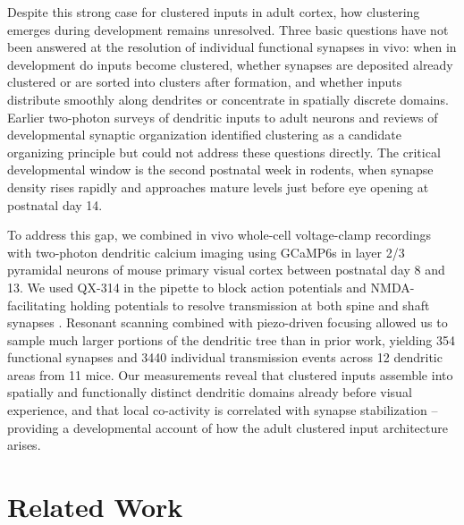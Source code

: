 Despite this strong case for clustered inputs in adult cortex, how clustering emerges during development remains unresolved. Three basic questions have not been answered at the resolution of individual functional synapses in vivo: when in development do inputs become clustered, whether synapses are deposited already clustered or are sorted into clusters after formation, and whether inputs distribute smoothly along dendrites or concentrate in spatially discrete domains. Earlier two-photon surveys of dendritic inputs to adult neurons \citep{jia2010dendritic} and reviews of developmental synaptic organization \citep{winnubst2012synaptic} identified clustering as a candidate organizing principle but could not address these questions directly. The critical developmental window is the second postnatal week in rodents, when synapse density rises rapidly and approaches mature levels just before eye opening at postnatal day 14.

To address this gap, we combined in vivo whole-cell voltage-clamp recordings with two-photon dendritic calcium imaging using GCaMP6s \citep{chen2013ultrasensitive} in layer 2/3 pyramidal neurons of mouse primary visual cortex between postnatal day 8 and 13. We used QX-314 in the pipette to block action potentials \citep{takahashi2012locally} and NMDA-facilitating holding potentials to resolve transmission at both spine and shaft synapses \citep{jia2010dendritic,svoboda1999spread}. Resonant scanning combined with piezo-driven focusing allowed us to sample much larger portions of the dendritic tree than in prior work, yielding 354 functional synapses and 3440 individual transmission events across 12 dendritic areas from 11 mice. Our measurements reveal that clustered inputs assemble into spatially and functionally distinct dendritic domains already before visual experience, and that local co-activity is correlated with synapse stabilization -- providing a developmental account of how the adult clustered input architecture arises.

\section{Related Work}

